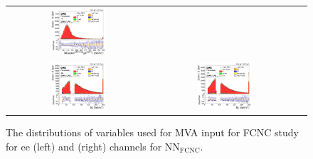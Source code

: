\begin{figure}[ht]
\begin{center}
\begin{tabular}{ccc}
      \includegraphics[width=0.4\textwidth]{figures/tW/fig/FCNC_MVA_input/mumu/H_BSM_xj1b_M_l2_j1.png}\\
      \includegraphics[width=0.4\textwidth]{figures/tW/fig/FCNC_MVA_input/ee/H_BSM_xj1b_Mll.png}&
      \includegraphics[width=0.4\textwidth]{figures/tW/fig/FCNC_MVA_input/mumu/H_BSM_xj1b_Mll.png}\\
    \end{tabular}
    \caption{The distributions of variables used for MVA input for FCNC study for ee (left) and \mumu (right) channels for NN$_{\text{FCNC}}$.
    \label{fig:MVA_FCNC_1j1t_3}}
  \end{center}
\end{figure}

